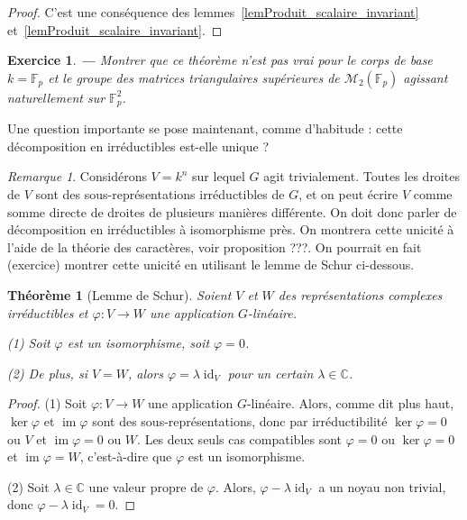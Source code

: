 \documentclass[a4paper]{article}
\newcounter{question}
\newtheorem{enonce}{Exercice}
\newenvironment{exo}[0]{\begin{enonce}{\bf ---}\rm\setcounter{question}{1}}{\end{enonce}}
\theoremstyle{definition} %
\theoremstyle{plain} %
\newtheorem{Thm}[Def]{Théorème} %
\theoremstyle{remark} %
\newtheorem{Rq}[Def]{Remarque} %
\newcommand{\C}{\mathbb{C}}
\begin{document}
 \begin{proof}
 	C'est une conséquence des lemmes~\ref{lemProduit_scalaire_invariant} et~\ref{lemProduit_scalaire_invariant}.
 \end{proof}

 \begin{exo}
Montrer que ce théorème n'est pas vrai pour le corps de base $k = \mathbb{F}_p$ et le groupe des matrices triangulaires supérieures de $\mathcal{M}_2(\mathbb{F}_p)$ agissant naturellement sur {$\mathbb{F}_p^2$}.
\end{exo}

Une question importante se pose maintenant, comme d'habitude : cette décomposition en irréductibles est-elle unique ? 

\begin{Rq}
	Considérons $V = k^n$ sur lequel $G$ agit trivialement. Toutes les droites de $V$ sont des sous-représentations irréductibles de $G$, et on peut écrire $V$ comme somme directe de droites de plusieurs manières différente. On doit donc parler de décomposition en irréductibles à isomorphisme près. On montrera cette unicité à l'aide de la théorie des caractères, voir proposition ???. On pourrait en fait (exercice) montrer cette unicité en utilisant le lemme de Schur ci-dessous.
\end{Rq}


\begin{Thm}[Lemme de Schur]
	\hspace*{\fill}
	
	Soient $V$ et $W$ des représentations complexes irréductibles et $\varphi : V \rightarrow W$ une application $G$-linéaire.
	
	(1) Soit $\varphi$ est un isomorphisme, soit $\varphi=0$.
		
	(2) De plus, si $V=W$, alors $\varphi = \lambda \operatorname{id}_V$ pour un certain $\lambda \in \mathbb{C}$.	
\end{Thm}
 
 \begin{proof}
 	(1) Soit $\varphi : V \rightarrow W$ une application $G$-linéaire. Alors, comme dit plus haut, $\ker \varphi$ et $\operatorname{im} \varphi$ sont des sous-représentations, donc par irréductibilité $\ker \varphi = 0$ ou $V$ et $\operatorname{im} \varphi = 0$ ou $W$. Les deux seuls cas compatibles sont $\varphi=0$ ou $\ker \varphi=0$ et $\operatorname{im} \varphi = W$, c'est-à-dire que $\varphi$ est un isomorphisme.
 	
 	(2) Soit $\lambda\in \C$ une valeur propre de $\varphi$. Alors, $\varphi - \lambda \operatorname{id}_V$ a un noyau non trivial, donc $\varphi  - \lambda \operatorname{id}_V = 0$.
 \end{proof}
 
\end{document}
